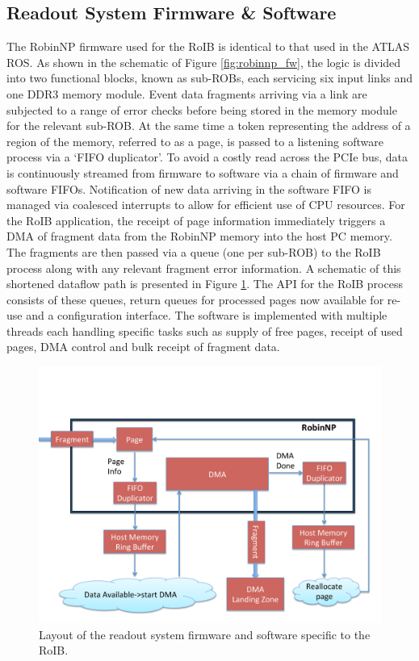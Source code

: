 \subsection{Readout System Firmware \& Software}\label{sec:crorc_fw}

The RobinNP firmware used for the RoIB is identical to that used in the ATLAS ROS\cite{ros}. As shown in 
the schematic of Figure \ref{fig:robinnp_fw}, the logic is divided into two functional blocks, known as sub-ROBs, 
each servicing six input links and one DDR3 memory module. Event data fragments arriving via a link are subjected 
to a range of error checks before being stored in the memory module for the relevant sub-ROB. At the same time a token
representing the address of a region of the memory, referred to as a page, is passed to a listening software process via 
a `FIFO duplicator'. To avoid a costly read across the PCIe bus, data is continuously streamed from firmware to 
software via a chain of firmware and software FIFOs. Notification of new data arriving in the software FIFO is managed via coalesced 
interrupts to allow for efficient use of CPU resources.
For the RoIB application, the receipt of page information immediately triggers a DMA of fragment data from the RobinNP memory into 
the host PC memory. The fragments are then passed via a queue (one per sub-ROB) to the RoIB process along with any relevant fragment 
error information. A schematic of this shortened dataflow path is presented in Figure \ref{fig:roib_swfw}. 
The API for the RoIB process consists of these queues, return queues for processed pages now available for re-use and 
a configuration interface. The software is implemented with multiple threads each handling specific tasks such as supply of free pages, receipt
of used pages, DMA control and bulk receipt of fragment data.


\begin{figure}[tbp] %
\centering
\includegraphics[trim = 0cm 0cm 0cm 5cm, width=.7\textwidth]{RobinNP_Software}
\caption{Layout of the readout system firmware and software specific to the RoIB.}
\label{fig:roib_swfw}
\end{figure}

